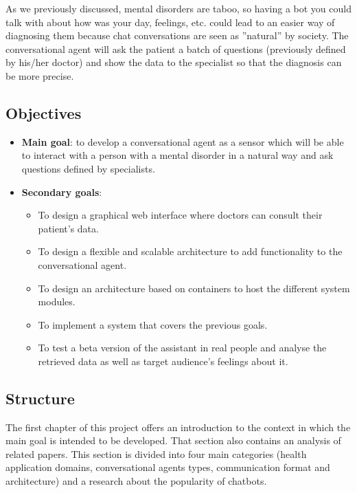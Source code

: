\documentclass[12pt,english]{article}
\begin{document}
As we previously discussed, mental disorders are taboo, so having a bot you could talk with about how was your day, feelings, etc. could lead to an easier way of diagnosing them because chat conversations are seen as ''natural'' by society. The conversational agent will ask the patient a batch of questions (previously defined by his/her doctor) and show the data to the specialist so that the diagnosis can be more precise.

\newpage

\subsection{Objectives}

\begin{itemize}
  \item \textbf{Main goal}: to develop a conversational agent as a sensor which will be able to interact with a person with a mental disorder in a natural way and ask questions defined by specialists.
  \item \textbf{Secondary goals}:
    \begin{itemize}
      \item To design a graphical web interface where doctors can consult their patient's data.
      \item To design a flexible and scalable architecture to add functionality to the conversational agent.
      \item To design an architecture based on containers to host the different system modules.
      \item To implement a system that covers the previous goals.
      \item To test a beta version of the assistant in real people and analyse the retrieved data as well as target audience's feelings about it.
    \end{itemize}
\end{itemize}

\subsection{Structure}

The first chapter of this project offers an introduction to the context in which the main goal is intended to be developed. That section also contains an analysis of related papers. This section is divided into four main categories (health application domains, conversational agents types, communication format and architecture) and a research about the popularity of chatbots.\\
\end{document}

